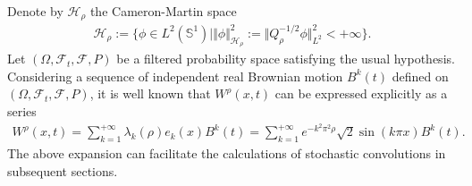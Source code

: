 \documentclass[11pt]{article}
\numberwithin{equation}{section}%
\numberwithin{figure}{section}%
\theoremstyle{remark}
\begin{document}
	Denote by $\mathcal{H}_{\rho}$ the Cameron-Martin space
	\begin{align*}
		\mathcal{H}_{\rho}:=\{\phi\in L^{2}(\mathbb{S}^{1})\mid\Vert \phi\Vert^{2}_{\mathcal{H}_{\rho}}:=\Vert Q^{-1/2}_{\rho}  \phi\Vert^{2}_{L^{2}}<+\infty\}.
	\end{align*}
		Let $(\Omega,\mathcal{F}_{t},\mathcal{F},P)$ be a filtered probability space satisfying the usual hypothesis. Considering a sequence of independent real Brownian motion $B^{k}(t)$ defined on $(\Omega,\mathcal{F}_{t},\mathcal{F},P)$, it is well known that $W^{\rho}(x,t)$ can be expressed explicitly as a series 
		\begin{align}\label{eq:1.5}
			W^{\rho}(x,t)= \sum_{k=1}^{+\infty}\lambda_{k}(\rho) e_{k}(x) B^{k}(t)=\sum_{k=1}^{+\infty}e^{-k^{2}\pi^{2}\rho} \sqrt{2}\sin(k\pi x)B^{k}(t).
		\end{align}
		The above expansion can facilitate the calculations of stochastic convolutions in subsequent sections.
		
\end{document}
